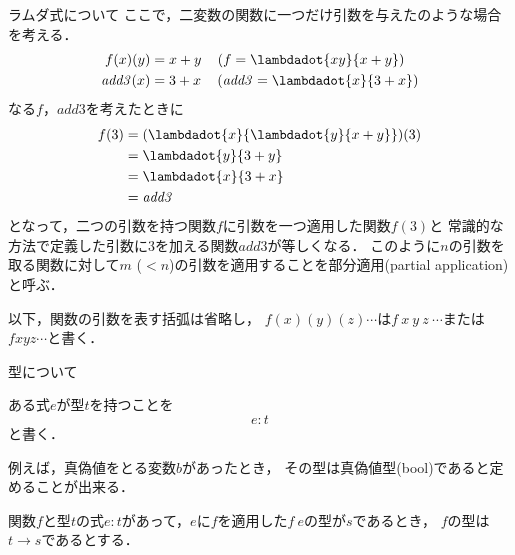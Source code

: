 \documentclass[a4paper,titlepage,report,disablejfam]{jsbook}
\begin{document}
\begin{resbonsiblesection}{ラムダ式について}{\sakamoto}
ここで，二変数の関数に一つだけ引数を与えたのような場合を考える．
\begin{align}
f (x)(y) &= x + y \quad \left(f = \lambdadot{xy}{x + y}\right) \\
\mathit{add3}(x)   &= 3 + x \quad \left(\mathit{add3} = \lambdadot{x}{3 + x}\right) 
\end{align}
なる$f$，$\mathit{add3}$を考えたときに
\begin{align}
\begin{aligned}
f(3)            &= (\lambdadot{x}{\lambdadot{y}{x+y}})(3) \\
                &= \lambdadot{y}{3 + y} \\
                &= \lambdadot{x}{3 + x} \\
                &= \mathit{add3}
\end{aligned}
\end{align}
となって，二つの引数を持つ関数$f$に引数を一つ適用した関数$f(3)$と
常識的な方法で定義した引数に3を加える関数$\mathit{add3}$が等しくなる．
このように$n$の引数を取る関数に対して$m$ ($<n$)の引数を適用することを部分適用(partial application)と呼ぶ．

以下，関数の引数を表す括弧は省略し，
$f(x)(y)(z)\cdots$は$f\ x\ y\ z\ \cdots$または$f x y z \cdots$と書く．
\end{resbonsiblesection}



\begin{resbonsiblesection}{型について}{\sakamoto}\label{sc:about-type}

ある式$e$が型$t$を持つことを
\begin{equation}
e: t
\end{equation}
と書く．

例えば，真偽値をとる変数$b$があったとき，
その型は真偽値型(\textsf{bool})であると定めることが出来る．

関数$f$と型$t$の式$e:t$があって，$e$に$f$を適用した$f\ e$の型が$s$であるとき，
$f$の型は$t\rightarrow s$であるとする．
\end{resbonsiblesection}
\end{document}
